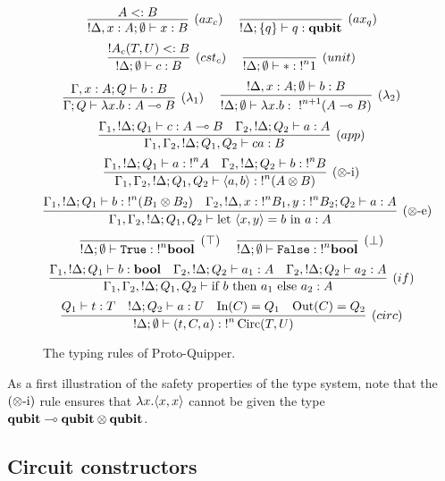\documentclass[twoside]{article}
\begin{document}
\begin{figure}[!ht]
\begin{mdframed}
\[
\infer[(ax_c)]{{!}\Delta, x:A;\emptyset\entails x:B}{
  A<:B
}
~~~~
\infer[(ax_q)]{{!}\Delta;\s{q}\entails q:\qubit}{
} 
\]
\[
\infer[(cst_c)]{{!}\Delta;\emptyset \entails c:B}{
  {!}A_{c}(T,U)<:B
} 
~~~~
\infer[(unit)]{{!}\Delta;\emptyset\entails *:{!}^n 1}{
}
\]
\[
\infer[(\lambda_1)]{\Gamma;Q\entails \lambda x.b:A\loli B}{
  \Gamma,x:A;Q \entails b:B
}
~~~~
\infer[(\lambda_2)]{{!}\Delta;\emptyset \entails \lambda x.b:~{!}^{n+1}(A\loli B)}{
  {!}\Delta, x:A;\emptyset \entails b:B
}
\]
\[
\infer[(app)]{\Gamma_1,\Gamma_2, {!}\Delta;Q_1,Q_2\entails ca:B}{
  \Gamma_1, {!}\Delta;Q_1\entails c:A\loli B 
  &
  \Gamma_2, {!}\Delta ;Q_2\entails a:A 
}
\]
\[
\infer[(\x\mbox{-i})]{\Gamma_1,\Gamma_2, {!}\Delta;Q_1,Q_2\entails \p{a,b}:{!}^n(A\x B)}{
  \Gamma_1, {!}\Delta;Q_1\entails a:{!}^nA 
  &
  \Gamma_2, {!}\Delta ;Q_2\entails b:{!}^nB
}
\]
\[
\infer[(\x\mbox{-e})]{\Gamma_1,\Gamma_2, {!}\Delta;Q_1,Q_2\entails \letin{\p{x,y}}{b}{a}:A}{
  \Gamma_1, {!}\Delta;Q_1\entails b:{!}^n(B_1\x B_2) 
  &
  \Gamma_2, {!}\Delta, x:{!}^nB_1, y:{!}^nB_2 ;Q_2\entails a:A
}
\]
\[
\infer[(\top)]{{!}\Delta;\emptyset\entails \true:{!}^n \bool}{
} 
~~~~
\infer[(\bot)]{{!}\Delta;\emptyset\entails \false:{!}^n \bool}{
}
\]
\[
\infer[(if)]{\Gamma_1,\Gamma_2, {!}\Delta;Q_1,Q_2\entails \ifthenelse{b}{a_1}{a_2}:A}{
  \Gamma_1, {!}\Delta;Q_1\entails b:\bool 
  &
  \Gamma_2, {!}\Delta;Q_2 \entails a_1:A ~~~ \Gamma_2, {!}\Delta;Q_2 \entails a_2:A
}
\]
\[
\infer[(circ)]{{!}\Delta;\emptyset \entails (t,C,a):{!}^n\Circ(T,U)}{
  Q_1\entails t:T 
  &
  {!}\Delta ; Q_2\entails a:U 
  &
  \In(C)=Q_1 
  &
  \Out(C)=Q_2
}
\]
\end{mdframed}
\caption{The typing rules of Proto-Quipper.}
\label{trules}
\end{figure}

As a first illustration of the safety properties of the type system,
note that the $(\otimes\mbox{-i})$ rule ensures that $\lambda x. \langle x,x\rangle$
cannot be given the type $\textrm{\bf qubit}\multimap \textrm{\bf qubit} \otimes \textrm{\bf qubit}$.


\subsection{Circuit constructors}\label{ssec-circuit-cons}
\end{document}
